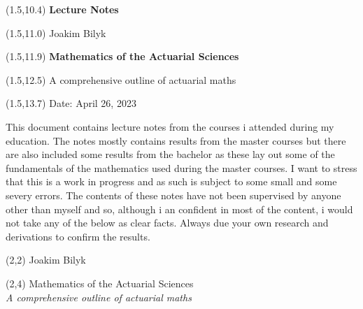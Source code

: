 \documentclass[a4paper,12pt,openany]{book}
\begin{document}
\thispagestyle{empty}

\begin{textblock}{12}(1.5,10.4) \noindent\fontsize{20}{20}\selectfont \textbf{Lecture Notes}
\end{textblock}

\begin{textblock}{12}(1.5,11.0) \noindent\fontsize{14}{14}\selectfont Joakim Bilyk
\end{textblock}

\begin{textblock}{12}(1.5,11.9)
\noindent\fontsize{20}{20}\selectfont \textbf{Mathematics of the Actuarial Sciences}
\end{textblock}

\begin{textblock}{12}(1.5,12.5)
    \noindent\fontsize{14}{14}\selectfont A comprehensive outline of actuarial maths
\end{textblock}

\begin{textblock}{12}(1.5,13.7)
\noindent\fontsize{11}{11}\selectfont Date: April 26, 2023
\end{textblock}

\hspace{1pt}
\newpage

\onehalfspacing
\thispagestyle{empty}
\noindent

This document contains lecture notes from the courses i attended during my education. The notes mostly contains results from the master courses but there are also included some results from the bachelor as these lay out some of the fundamentals of the mathematics used during the master courses. I want to stress that this is a work in progress and as such is subject to some small and some severy errors. The contents of these notes have not been supervised by anyone other than myself and so, although i an confident in most of the content, i would not take any of the below as clear facts. Always due your own research and derivations to confirm the results.

\newpage

\thispagestyle{empty}

\begin{textblock}{12}(2,2)
\noindent\fontsize{20}{20}\selectfont Joakim Bilyk
\end{textblock}

\begin{textblock}{12}(2,4)
\noindent\fontsize{35pt}{40pt}\selectfont Mathematics of the Actuarial Sciences\\
\fontsize{20pt}{40pt}\selectfont \emph{A comprehensive outline of actuarial maths}
\end{textblock}
\end{document}
